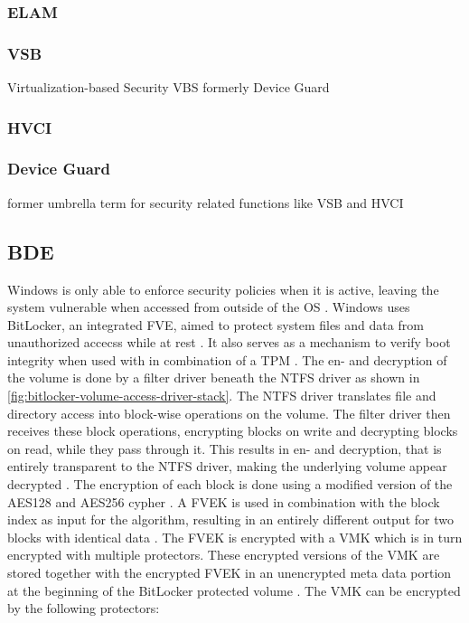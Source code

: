 \subsubsection{ELAM}
\cite{understanding-windows-trusted-boot}

\subsubsection{VSB}
Virtualization-based Security {VBS}
formerly Device Guard
\subsubsection{HVCI}
\subsubsection{Device Guard}
former umbrella term for security related functions
like VSB and HVCI

\subsection{\acf{BDE}}
\label{sec:windows:security:bde}
Windows is only able to enforce security policies when it is active, leaving the system vulnerable when accessed from outside of the \ac{OS} \cite[Section 9]{windows-internals-6-part2}.
Windows uses BitLocker, an integrated \ac{FVE}, aimed to protect system files and data from unauthorized accecss while at rest \cite{microsoft-bitlocker-overview}.
It also serves as a mechanism to verify boot integrity when used with in combination of a \ac{TPM} \cite[Section 9]{windows-internals-6-part2}.
The en- and decryption of the volume is done by a filter driver beneath the \ac{NTFS} driver as shown in \autoref{fig:bitlocker-volume-access-driver-stack}.
The \ac{NTFS} driver translates file and directory access into block-wise operations on the volume.
The filter driver then receives these block operations, encrypting blocks on write and decrypting blocks on read, while they pass through it.
This results in en- and decryption, that is entirely transparent to the \ac{NTFS} driver, making the underlying volume appear decrypted \cite[Section 9]{windows-internals-6-part2}.
The encryption of each block is done using a modified version of the \ac{AES}128 and \ac{AES}256 cypher \cite[Section 9]{windows-internals-6-part2}.
A \ac{FVEK} is used in combination with the block index as input for the algorithm, resulting in an entirely different output for two blocks with identical data \cite[Section 9]{windows-internals-6-part2}.
The \ac{FVEK} is encrypted with a \ac{VMK} which is in turn encrypted with multiple protectors.
These encrypted versions of the \ac{VMK} are stored together with the encrypted \ac{FVEK} in an unencrypted meta data portion at the beginning of the BitLocker protected volume \cite[Section 9]{windows-internals-6-part2}.
The \ac{VMK} can be encrypted by the following protectors:

